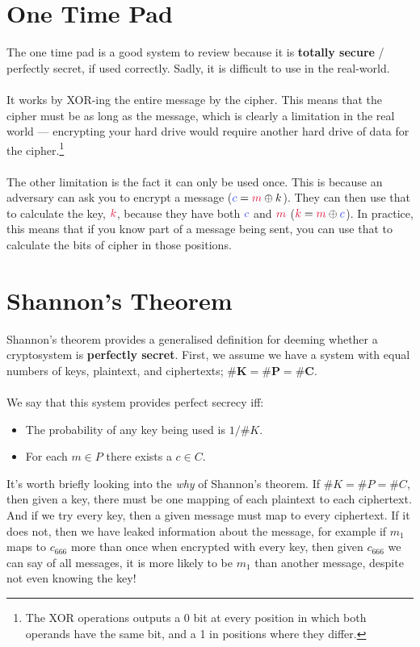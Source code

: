 \section{One Time Pad}
  The one time pad is a good system to review because it is \textbf{totally secure} / perfectly secret, if used correctly. Sadly, it is difficult to use in the real-world.\\
  \\
  It works by XOR-ing the entire message by the cipher. This means that the cipher must be as long as the message, which is clearly a limitation in the real world --- encrypting your hard drive would require another hard drive of data for the cipher.\footnote{The XOR operations outputs a 0 bit at every position in which both operands have the same bit, and a 1 in positions where they differ.}\\
  \\
  The other limitation is the fact it can only be used once. This is because an adversary  can ask you to encrypt a message ($\cc=\cm\oplus k$). They can then use that to calculate the key, $\ck$,  because they have both $\cc$ and $\cm$ ($\ck=\cm\oplus \cc$). In practice, this means that if you know part of a message being sent, you can use that to calculate the bits of cipher in those positions.

\section{Shannon's Theorem}
  
  Shannon's theorem provides a generalised definition for deeming whether a cryptosystem is \textbf{perfectly secret}. First, we assume we have a system with equal numbers of keys, plaintext, and ciphertexts; $\mathbf{\#K = \#P = \#C}$.\\
  \\
  We say that this system provides perfect secrecy iff:
  \begin{itemize}
    \item The probability of any key being used is $1/\#K$.
    \item For each $m \in P$ there exists a $c \in C$.
  \end{itemize}
  It's worth briefly looking into the \textit{why} of Shannon's theorem. If $\#K = \#P = \#C$, then given a key, there must be one mapping of each plaintext to each ciphertext. And if we try every key, then a given message must map to every ciphertext. If it does not, then we have leaked information about the message, for example if $m_1$ maps to $c_{666}$ more than once when encrypted with every key, then given $c_{666}$ we can say of all messages, it is more likely to be $m_1$ than another message, despite not even knowing the key!